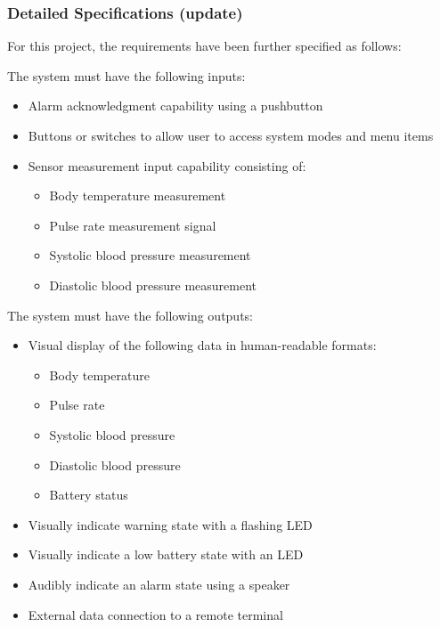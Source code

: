 \documentclass[12pt]{article} %
\begin{document}
\subsubsection{Detailed Specifications (update)}
For this project, the requirements have been further specified as follows:

\begin{itemize}[$$]
  \item The system must have the following inputs:
    \begin{itemize}[$\bullet$]
      \item Alarm acknowledgment capability using a pushbutton
      \item Buttons or switches to allow user to access system modes and menu items
      \item Sensor measurement input capability consisting of:
	\begin{itemize}
	  \item Body temperature measurement
	  \item Pulse rate measurement signal
	  \item Systolic blood pressure measurement
	  \item Diastolic blood pressure measurement
	\end{itemize}
    \end{itemize}
\end{itemize}


\begin{itemize}[$$]
  \item The system must have the following outputs:
    \begin{itemize}[$\bullet$]
      \item Visual display of the following data in human-readable formats:
	\begin{itemize}
	  \item Body temperature
	  \item Pulse rate
	  \item Systolic blood pressure
	  \item Diastolic blood pressure
	  \item Battery status
	\end{itemize}
      \item Visually indicate warning state with a flashing LED
      \item Visually indicate a low battery state with an LED
      \item Audibly indicate an alarm state using a speaker
      \item External data connection to a remote terminal
    \end{itemize}
\end{itemize}
\end{document}
